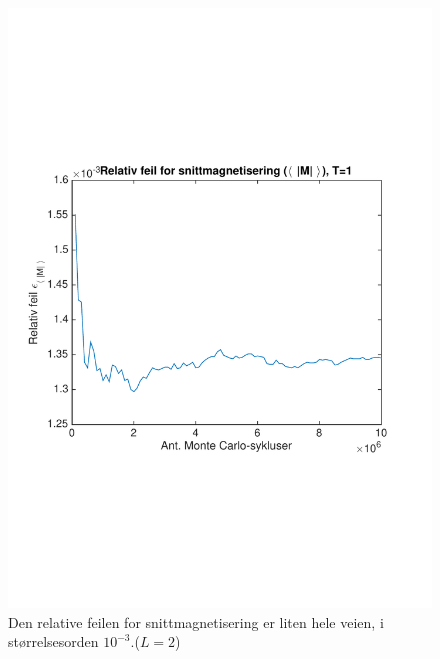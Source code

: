\documentclass[norsk, 10pt]{article}
\begin{document}
\begin{figure}[H]
\centering
\includegraphics[scale = 0.5, trim = 1cm 8cm 1cm 8cm]{b_rel_err_mag_L2_T1.pdf}
\caption{Den relative feilen for snittmagnetisering er liten hele veien, i størrelsesorden $10^{-3}$.($L=2$)}
\label{fig:errmagT1L2}
\end{figure}
\end{document}
